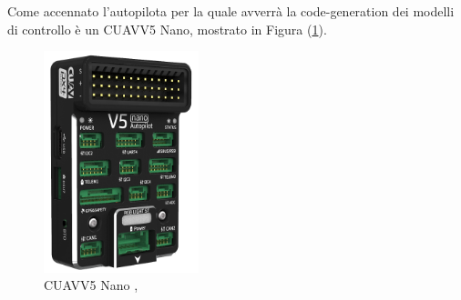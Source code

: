 Come accennato l'autopilota per la quale avverrà la code-generation dei modelli di controllo è un CUAV\textregistered V5 Nano\textregistered, mostrato in Figura (\ref{fig:CUAV}).

\begin{figure}
	\centering
	\includegraphics[width=0.4\textwidth]{DescrizioneAutopilota/Figure/CUAV}
	\caption{CUAV\textregistered V5 Nano , \cite{CUAV}}
	\label{fig:CUAV}
\end{figure}

